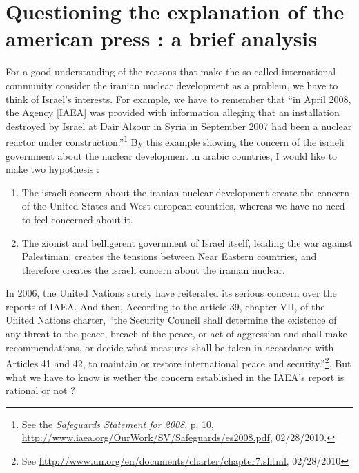 \documentclass[10pt,a4paper]{scrartcl} %
\begin{document}
\section{Questioning the explanation of the american press : a brief analysis}

For a good understanding of the reasons that make the so-called international community consider the iranian nuclear development as a problem, we have to think of Israel's interests. For example, we have to remember that \textquotedblleft in April 2008, the Agency [IAEA] was provided with information alleging that an installation
destroyed by Israel at Dair Alzour in Syria in September 2007 had been a nuclear reactor
under construction.\textquotedblright\footnote{See the \emph{Safeguards Statement for 2008}, p. 10, \url{http://www.iaea.org/OurWork/SV/Safeguards/es2008.pdf}, 02/28/2010.} By this example showing the concern of the israeli government about the nuclear development in arabic countries, I would like to make two hypothesis :
\begin{enumerate}
 \item
The israeli concern about the iranian nuclear development create the concern of the United States and West european countries, whereas we have no need to feel concerned about it.
\item
The zionist and belligerent government of Israel itself, leading the war against Palestinian, creates the tensions between Near Eastern countries, and therefore creates the israeli concern about the iranian nuclear.
\end{enumerate}

In 2006, the United Nations surely have reiterated its serious concern over the reports of IAEA. And then, According to the article 39, chapter VII, of the United Nations charter, \textquotedblleft the Security Council shall determine the existence of any threat to the peace, breach of the peace, or act of aggression and shall make recommendations, or decide what measures shall be taken in accordance with Articles 41 and 42, to maintain or restore international peace and security.\textquotedblright\footnote{See \url{http://www.un.org/en/documents/charter/chapter7.shtml}, 02/28/2010}. But what we have to know is wether the concern established in the IAEA's report is rational or not ?
\end{document}

